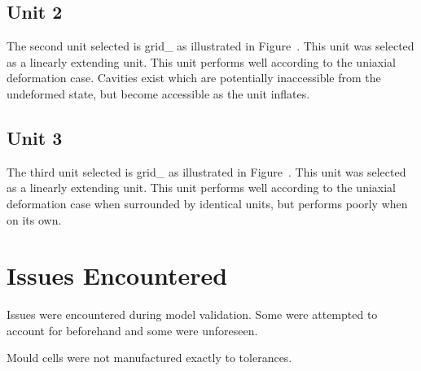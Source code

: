 \subsection{Unit 2}

The second unit selected is grid\_ as illustrated in Figure~. This unit was selected as a linearly extending unit. This unit performs well according to the uniaxial deformation case. Cavities exist which are potentially inaccessible from the undeformed state, but become accessible as the unit inflates.

\subsection{Unit 3}

The third unit selected is grid\_ as illustrated in Figure~. This unit was selected as a linearly extending unit. This unit performs well according to the uniaxial deformation case when surrounded by identical units, but performs poorly when on its own.

\section{Issues Encountered}

Issues were encountered during model validation. Some were attempted to account for beforehand and some were unforeseen.

Mould cells were not manufactured exactly to tolerances.